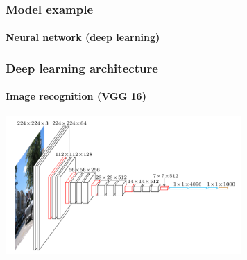 \documentclass[9pt]{beamer}
\begin{document}
\begin{frame}
  \frametitle{Model example}

  \framesubtitle{Neural network (deep learning)}

  \begin{center}
    \scalebox{0.7}{
      
    }
  \end{center}
\end{frame}

\begin{frame}
  \frametitle{Deep learning architecture}

  \framesubtitle{Image recognition (VGG 16)}

  \begin{center}
    \includegraphics[width = 9cm]{images/vgg16_architecture.png}
  \end{center}

\end{frame}
\end{document}
